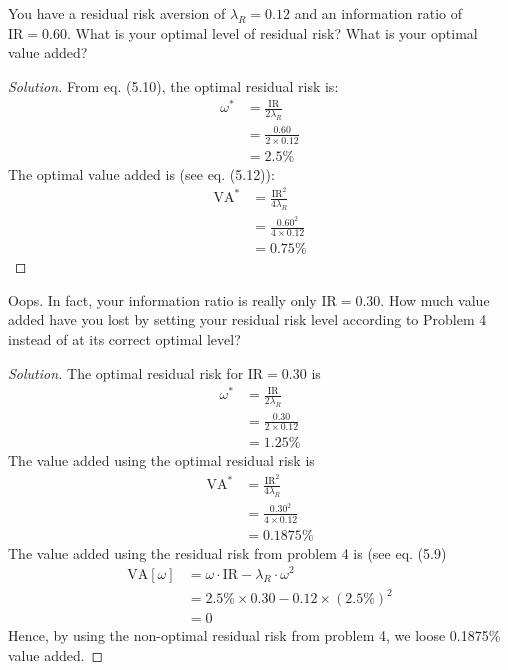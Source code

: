 \begin{problem}{5.4}
 You have a residual risk aversion of $\lambda_{R}=0.12$ and an information ratio of $\mathrm{IR}=0.60$. What is your optimal level of residual risk? What is your optimal value added?
\end{problem}

\begin{proof}[Solution]
 From eq. (5.10), the optimal residual risk is:
 \begin{align*}
  \omega^{*}&=\frac{\mathrm{IR}}{2\lambda_{R}}\\
	    &=\frac{0.60}{2\times 0.12}\\
	    &=2.5\%
 \end{align*}
 The optimal value added is (see eq. (5.12)):
 \begin{align*}
  \mathrm{VA^{*}}&=\frac{\mathrm{IR}^{2}}{4\lambda_{R}}\\
		 &=\frac{0.60^{2}}{4\times0.12}\\
		 &=0.75\%
 \end{align*}
\end{proof}

\begin{problem}{5.5}
 Oops. In fact, your information ratio is really only $\mathrm{IR}=0.30$. How much value added have you lost by setting your residual risk level according to Problem 4 instead of at its correct optimal level?
\end{problem}

\begin{proof}[Solution]
 The optimal residual risk for $\mathrm{IR}=0.30$ is
 \begin{align*}
  \omega^{*}&=\frac{\mathrm{IR}}{2\lambda_{R}}\\
	    &=\frac{0.30}{2\times 0.12}\\
	    &=1.25\%
 \end{align*}
 The value added using the optimal residual risk is
 \begin{align*}
  \mathrm{VA^{*}}&=\frac{\mathrm{IR}^{2}}{4\lambda_{R}}\\
		 &=\frac{0.30^{2}}{4\times0.12}\\
		 &=0.1875\%
 \end{align*}
 The value added using the residual risk from problem 4 is (see eq. (5.9)
 \begin{align*}
  \mathrm{VA}[\omega]&=\omega\cdot\mathrm{IR}-\lambda_{R}\cdot \omega^{2}\\
		     &=2.5\%\times 0.30 - 0.12\times(2.5\%)^{2}\\
		     &=0
 \end{align*}
 Hence, by using the non-optimal residual risk from problem 4, we loose 0.1875\% value added.
\end{proof}

